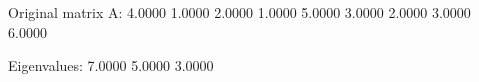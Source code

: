 Original matrix A:
   4.0000    1.0000    2.0000    
   1.0000    5.0000    3.0000
   2.0000    3.0000    6.0000
   
Eigenvalues:
 7.0000
 5.0000
 3.0000